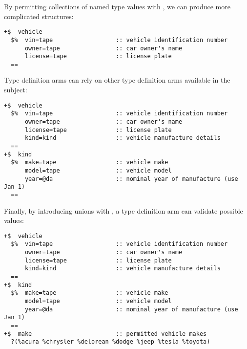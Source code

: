 By permitting collections of named type values with \buccen, we can produce more complicated structures:

\begin{lstlisting}[style=nonumbers]
+$  vehicle
  $%  vin=tape                  :: vehicle identification number
      owner=tape                :: car owner's name
      license=tape              :: license plate
  ==
\end{lstlisting}

Type definition arms can rely on other type definition arms available in the subject:

\begin{lstlisting}[style=nonumbers]
+$  vehicle
  $%  vin=tape                  :: vehicle identification number
      owner=tape                :: car owner's name
      license=tape              :: license plate
      kind=kind                 :: vehicle manufacture details
  ==
+$  kind
  $%  make=tape                 :: vehicle make
      model=tape                :: vehicle model
      year=@da                  :: nominal year of manufacture (use Jan 1)
  ==
\end{lstlisting}

Finally, by introducing unions with \bucwut, a type definition arm can validate possible values:

\begin{lstlisting}[style=nonumbers]
+$  vehicle
  $%  vin=tape                  :: vehicle identification number
      owner=tape                :: car owner's name
      license=tape              :: license plate
      kind=kind                 :: vehicle manufacture details
  ==
+$  kind
  $%  make=tape                 :: vehicle make
      model=tape                :: vehicle model
      year=@da                  :: nominal year of manufacture (use Jan 1)
  ==
+$  make                        :: permitted vehicle makes
  ?(%acura %chrysler %delorean %dodge %jeep %tesla %toyota)
\end{lstlisting}

